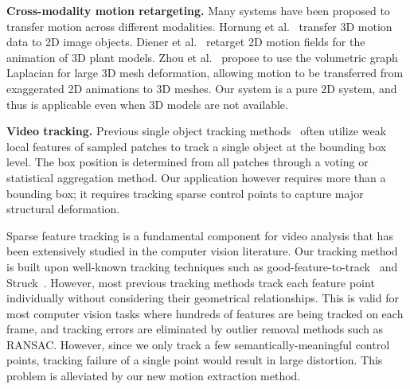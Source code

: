 \textbf{Cross-modality motion retargeting.}
Many systems have been proposed to transfer motion across different modalities. 
Hornung et al.~ transfer 3D motion data to 2D image objects. 
Diener et al.~ retarget 2D motion fields for the animation
of 3D plant models.
Zhou et al.~ propose to use the volumetric graph Laplacian for large 3D mesh deformation, allowing motion to be transferred from exaggerated 2D animations to 3D meshes.
Our system is a pure 2D system, and thus is applicable even when 3D models are not available.

\textbf{Video tracking.}
Previous single object tracking methods~\cite{Martinez:2008,Artner:2011,Cehovin:2013,Cai:2014} often utilize weak local features of sampled patches to track a single object at the bounding box level. 
The box position is determined from all patches through a voting or statistical aggregation method. Our application however requires more than a bounding box; it requires tracking sparse control points to capture major structural deformation. 

Sparse feature tracking is a fundamental component for video analysis that has been extensively studied in the computer vision literature.
Our tracking method is built upon well-known tracking techniques such as good-feature-to-track~\cite{Shi_1994_3266} and Struck~\cite{6126251}. However, most previous tracking methods track each feature point individually without considering their geometrical relationships. This is valid for most computer vision tasks where hundreds of features are being tracked on each frame, and tracking errors are eliminated by outlier removal methods such as RANSAC. However, since we only track a few semantically-meaningful control points, tracking failure of a single point would result in large distortion.
This problem is alleviated by our new motion extraction method. 



